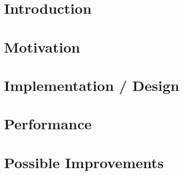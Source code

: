 \documentclass[11pt,a4paper]{book}
\begin{document}
\nocite{*}

\frontmatter


\chapter*{Introduction}
\label{c:Introduction}



\tableofcontents

\mainmatter
\chapter{Motivation}
\label{c:motivation}


\chapter{Implementation / Design}
\label{c:implementation}


\chapter{Performance}
\label{c:performance}


\chapter{Possible Improvements}
\label{c:improvements}

\end{document}
